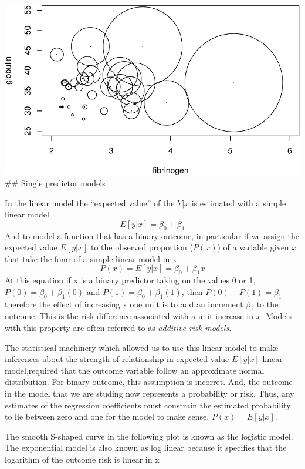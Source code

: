 \documentclass[
]{article}
\begin{document}
\includegraphics{LogisticRegressionCh5_files/figure-latex/unnamed-chunk-6-1.pdf}
\#\# Single predictor models

In the linear model the ``expected value'' of the \(Y|x\) is estimated
with a simple linear model \[E[y|x]=\beta_0 + \beta_1\] And to model a
function that has a binary outcome, in particular if we assign the
expected value \(E[y|x]\) to the observed proportion (\(P(x)\)) of a
variable given \(x\) that take the fomr of a simple linear model in x
\[P(x) = E[y|x] = \beta_0 + \beta_1 x\] At this equation if x is a
binary predictor taking on the values 0 or 1,
\(P(0) = \beta_0 + \beta_1 (0)\) and \(P(1) = \beta_0 + \beta_1(1)\),
then \(P(0)-P(1) = \beta_1\) therefore the effect of increasing x one
unit is to add an increment \(\beta_1\) to the outcome. This is the risk
difference associated with a unit increase in \(x\). Models with this
property are often referred to as \emph{additive risk models}.

The statistical machinery which allowed us to use this linear model to
make inferences about the strength of relationship in expected value
\(E[y|x]\) linear model,required that the outcome variable follow an
approximate normal distribution. For binary outcome, this assumption is
incorret. And, the outcome in the model that we are studing now
represents a probability or risk. Thus, any estimates of the regression
coefficients must constrain the estimated probability to lie between
zero and one for the model to make sense. \(P(x) = E[y|x]\).

The smooth S-shaped curve in the following plot is known as the logistic
model. The exponential model is also known as log linear because it
specifies that the logarithm of the outcome risk is linear in x
\end{document}

